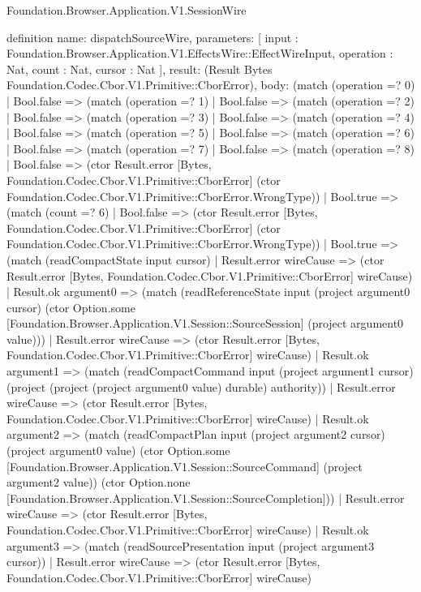 \begin{lexlean}{Foundation.Browser.Application.V1.SessionWire}
\begin{semanticmodule}
definition{
  name: dispatchSourceWire,
  parameters: [
    input : Foundation.Browser.Application.V1.EffectsWire::EffectWireInput,
    operation : Nat,
    count : Nat,
    cursor : Nat
  ],
  result: (Result Bytes Foundation.Codec.Cbor.V1.Primitive::CborError),
  body: (match (operation =? 0)
    | Bool.false => (match (operation =? 1)
      | Bool.false => (match (operation =? 2)
        | Bool.false => (match (operation =? 3)
          | Bool.false => (match (operation =? 4)
            | Bool.false => (match (operation =? 5)
              | Bool.false => (match (operation =? 6)
                | Bool.false => (match (operation =? 7)
                  | Bool.false => (match (operation =? 8)
                    | Bool.false => (ctor Result.error [Bytes, Foundation.Codec.Cbor.V1.Primitive::CborError] (ctor Foundation.Codec.Cbor.V1.Primitive::CborError.WrongType))
                    | Bool.true => (match (count =? 6)
                      | Bool.false => (ctor Result.error [Bytes, Foundation.Codec.Cbor.V1.Primitive::CborError] (ctor Foundation.Codec.Cbor.V1.Primitive::CborError.WrongType))
                      | Bool.true => (match (readCompactState input cursor)
                        | Result.error wireCause => (ctor Result.error [Bytes, Foundation.Codec.Cbor.V1.Primitive::CborError] wireCause)
                        | Result.ok argument0 => (match (readReferenceState input (project argument0 cursor) (ctor Option.some [Foundation.Browser.Application.V1.Session::SourceSession] (project argument0 value)))
                          | Result.error wireCause => (ctor Result.error [Bytes, Foundation.Codec.Cbor.V1.Primitive::CborError] wireCause)
                          | Result.ok argument1 => (match (readCompactCommand input (project argument1 cursor) (project (project (project argument0 value) durable) authority))
                            | Result.error wireCause => (ctor Result.error [Bytes, Foundation.Codec.Cbor.V1.Primitive::CborError] wireCause)
                            | Result.ok argument2 => (match (readCompactPlan input (project argument2 cursor) (project argument0 value) (ctor Option.some [Foundation.Browser.Application.V1.Session::SourceCommand] (project argument2 value)) (ctor Option.none [Foundation.Browser.Application.V1.Session::SourceCompletion]))
                              | Result.error wireCause => (ctor Result.error [Bytes, Foundation.Codec.Cbor.V1.Primitive::CborError] wireCause)
                              | Result.ok argument3 => (match (readSourcePresentation input (project argument3 cursor))
                                | Result.error wireCause => (ctor Result.error [Bytes, Foundation.Codec.Cbor.V1.Primitive::CborError] wireCause)
}
\end{semanticmodule}
\end{lexlean}
